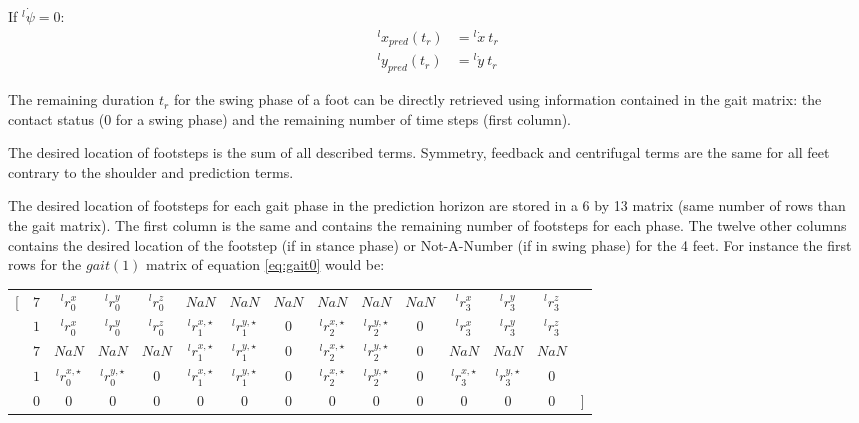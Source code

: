 \documentclass[a4paper,11pt]{article}
\begin{document}
If ${}^l\!\dot \psi = 0$:
\begin{align}
{}^l\!x_{pred}(t_r) &= {}^l\!\dot x ~ t_r \\
{}^l\!y_{pred}(t_r) &= {}^l\!\dot y ~ t_r
\end{align}

The remaining duration $t_r$ for the swing phase of a foot can be directly retrieved using information contained in the gait matrix: the contact status (0 for a swing phase) and the remaining number of time steps (first column).

The desired location of footsteps is the sum of all described terms. Symmetry, feedback and centrifugal terms are the same for all feet contrary to the shoulder and prediction terms.

The desired location of footsteps for each gait phase in the prediction horizon are stored in a 6 by 13 matrix (same number of rows than the gait matrix). The first column is the same and contains the remaining number of footsteps for each phase. The twelve other columns contains the desired location of the footstep (if in stance phase) or Not-A-Number (if in swing phase) for the 4 feet. For instance the first rows for the $gait(1)$ matrix of equation \ref{eq:gait0} would be: \vspace{-0.6cm}

\begin{center}
\begin{tabular}{ccccccccccccccc}
	[ & $7$ & ${}^l\!r_0^x$ & ${}^l\!r_0^y$ & ${}^l\!r_0^z$ & $\mathit{NaN}$ & $\mathit{NaN}$ & $\mathit{NaN}$ & $\mathit{NaN}$ & $\mathit{NaN}$ & $\mathit{NaN}$ & ${}^l\!r_3^x$ & ${}^l\!r_3^y$ & ${}^l\!r_3^z$ & \\
	  & $1$ & ${}^l\!r_0^x$ & ${}^l\!r_0^y$ & ${}^l\!r_0^z$ & ${}^l\!r_1^{x,\star}$ & ${}^l\!r_1^{y,\star}$ & 0 & ${}^l\!r_2^{x,\star}$ & ${}^l\!r_2^{y,\star}$ & 0 & ${}^l\!r_3^x$ & ${}^l\!r_3^y$ & ${}^l\!r_3^z$ & \\
	   & $7$ & $\mathit{NaN}$ & $\mathit{NaN}$ & $\mathit{NaN}$ & ${}^l\!r_1^{x,\star}$ & ${}^l\!r_1^{y,\star}$ & 0 & ${}^l\!r_2^{x,\star}$ & ${}^l\!r_2^{y,\star}$ & 0 & $\mathit{NaN}$ & $\mathit{NaN}$ & $\mathit{NaN}$ & \\
	& $1$ & ${}^l\!r_0^{x,\star}$ & ${}^l\!r_0^{y,\star}$ & 0 & ${}^l\!r_1^{x,\star}$ & ${}^l\!r_1^{y,\star}$ & 0 & ${}^l\!r_2^{x,\star}$ & ${}^l\!r_2^{y,\star}$ & 0 & ${}^l\!r_3^{x,\star}$ & ${}^l\!r_3^{y,\star}$ & 0 & \\
	& 0 & 0 & 0 & 0 & 0 & 0 & 0 & 0 & 0 & 0 & 0 & 0 & 0 & ]      
\end{tabular}
\end{center}
\end{document}
